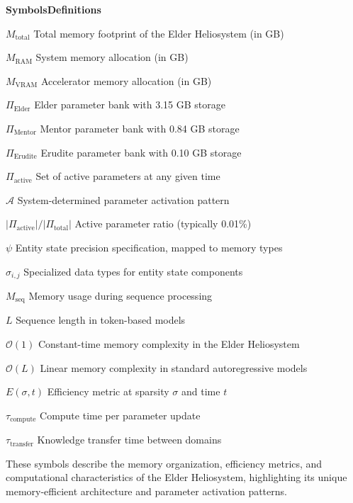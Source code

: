 \begin{multicols}{2}
\noindent\textbf{\large Symbols}\hfill\textbf{\large Definitions}

\vspace{0.3cm}
\noindent$M_{\text{total}}$ \dotfill Total memory footprint of the Elder Heliosystem (in GB)

\noindent$M_{\text{RAM}}$ \dotfill System memory allocation (in GB)

\noindent$M_{\text{VRAM}}$ \dotfill Accelerator memory allocation (in GB)

\noindent$\Pi_{\text{Elder}}$ \dotfill Elder parameter bank with 3.15 GB storage

\noindent$\Pi_{\text{Mentor}}$ \dotfill Mentor parameter bank with 0.84 GB storage

\noindent$\Pi_{\text{Erudite}}$ \dotfill Erudite parameter bank with 0.10 GB storage

\noindent$\Pi_{\text{active}}$ \dotfill Set of active parameters at any given time

\noindent$\mathcal{A}$ \dotfill System-determined parameter activation pattern

\noindent$|\Pi_{\text{active}}|/|\Pi_{\text{total}}|$ \dotfill Active parameter ratio (typically 0.01\%)

\noindent$\psi$ \dotfill Entity state precision specification, mapped to memory types

\noindent$\sigma_{i,j}$ \dotfill Specialized data types for entity state components

\noindent$M_{\text{seq}}$ \dotfill Memory usage during sequence processing

\noindent$L$ \dotfill Sequence length in token-based models

\noindent$\mathcal{O}(1)$ \dotfill Constant-time memory complexity in the Elder Heliosystem

\noindent$\mathcal{O}(L)$ \dotfill Linear memory complexity in standard autoregressive models

\noindent$E(\sigma,t)$ \dotfill Efficiency metric at sparsity $\sigma$ and time $t$

\noindent$\tau_{\text{compute}}$ \dotfill Compute time per parameter update

\noindent$\tau_{\text{transfer}}$ \dotfill Knowledge transfer time between domains
\end{multicols}

\vspace{1cm}
\begin{center}
These symbols describe the memory organization, efficiency metrics, and computational characteristics of the Elder Heliosystem, highlighting its unique memory-efficient architecture and parameter activation patterns.
\end{center}


